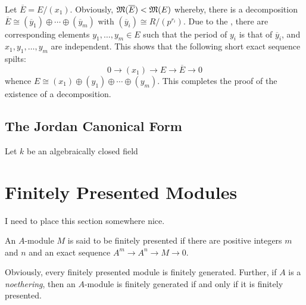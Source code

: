 Let $\overline E = E/(x_1)$. Obviously, $\mathfrak{M}(\overline E) < \mathfrak{M}(E)$ whereby, there is a decomposition $\overline E\cong (\overline y_1)\oplus\cdots\oplus(\overline y_m)$ with $(\overline y_i)\cong R/(p^{r_i})$. Due to the , there are corresponding elements $y_1,\ldots,y_m\in E$ such that the period of $y_i$ is that of $\overline y_i$, and $x_1,y_1,\ldots,y_m$ are independent. This shows that the following short exact sequence spilts: 
\begin{equation*}
    0\rightarrow(x_1)\rightarrow E\rightarrow\overline E\rightarrow 0
\end{equation*}
whence $E\cong(x_1)\oplus(y_1)\oplus\cdots\oplus(y_m)$. This completes the proof of the existence of a decomposition.

\subsection{The Jordan Canonical Form}

Let $k$ be an algebraically closed field 

\section{Finitely Presented Modules}

I need to place this section somewhere nice.

\begin{definition}
    An $A$-module $M$ is said to be finitely presented if there are positive integers $m$ and $n$ and an exact sequence $A^m\rightarrow A^n\rightarrow M\rightarrow 0$.
\end{definition}

Obviously, every finitely presented module is finitely generated. Further, if $A$ is a \textit{noethering}, then an $A$-module is finitely generated if and only if it is finitely presented.

